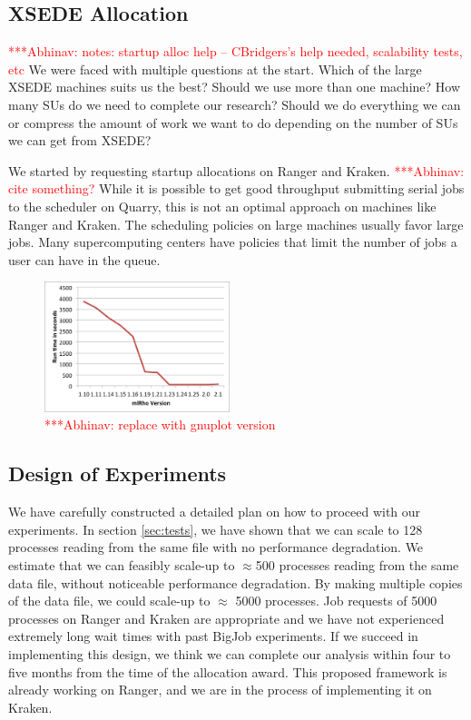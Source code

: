 \documentclass{sig-alternate}
\newcommand{\abhi}[1]{ {\textcolor{red} { ***Abhinav: #1 }}}
\newcommand{\abhi}[1]{ {}}
\begin{document}
\subsection{XSEDE Allocation}
\abhi{notes: startup alloc help -- CBridgers's help needed, scalability tests, etc}
We were faced with multiple questions at the start. Which of the large XSEDE machines suits us the best? Should we use more than one machine? How many SUs do we need to complete our research? Should we do everything we can or compress the amount of work we want to do depending on the number of SUs we can get from XSEDE?

We started by requesting startup allocations on Ranger and Kraken.  \abhi{cite something?} While it is possible to get good throughput submitting serial jobs to the scheduler on Quarry, this is not an optimal approach on machines like Ranger and Kraken. The scheduling policies on large machines usually favor large jobs. Many supercomputing centers have policies that limit the number of jobs a user can have in the queue. 

\begin{figure} %
\centering
\includegraphics[width=0.48\textwidth]{figures/mlrho-benchmarks.png}
\caption{\abhi{replace with gnuplot version}}
\label{fig:stampede-bench}
\end{figure}


\subsection{Design of Experiments}
We have carefully constructed a detailed plan on how to proceed with our experiments. In section \ref{sec:tests}, we have shown that we can scale to 128 processes reading from the same file with no performance degradation. We estimate that we can feasibly scale-up to $\approx$500 processes reading from the same data file, without noticeable performance degradation. By making multiple copies of the data file, we could scale-up to $\approx$ 5000 processes. Job requests of 5000 processes on Ranger and Kraken are appropriate and we have not experienced extremely long wait times with past BigJob experiments. If we succeed in implementing this design, we think we can complete our analysis within four to five months from the time of the allocation award. This proposed framework is already working on Ranger, and we are in the process of implementing it on Kraken. 
\end{document}
